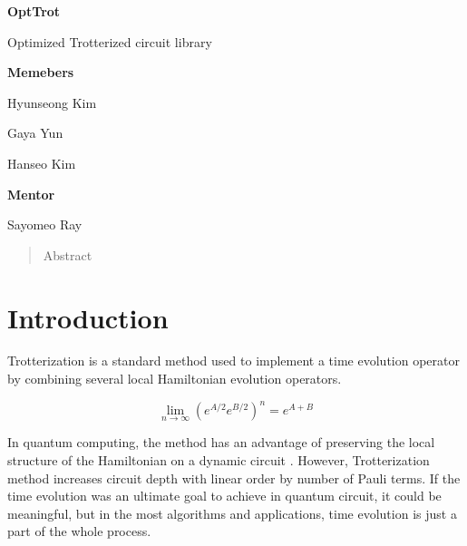 \documentclass[a4paper,12pt]{article}
\newcommand{\courseName}{2024 IonQ summer Mentoring}
\newcommand{\assignmentTitle}{OptTrot}
\begin{document}
\begin{center}

    \vspace{0.5cm}
    {\Large\bfseries \assignmentTitle \par}
    {\large Optimized Trotterized circuit library \par}
    \vspace{1cm}
    {
    \noindent
    \begin{minipage}{0.45\textwidth}
        \centering
        \textbf{Memebers}

        Hyunseong Kim

        Gaya Yun

        Hanseo Kim
    \end{minipage}
    \begin{minipage}{0.45\textwidth}
        \centering
        \textbf{Mentor}

        Sayomeo Ray
    \end{minipage}
    }
    \begin{abstract}
    Abstract
    \end{abstract}
\end{center}



\section{Introduction}

Trotterization is a standard method used to implement a time evolution operator 
by combining several local Hamiltonian evolution operators.

\begin{equation}
    \lim_{n \rightarrow \infty} (e^{A/2} e^{B/2})^n = e^{A+B}
\end{equation}

In quantum computing, the method has an advantage of preserving the local structure of 
the Hamiltonian on a dynamic circuit \cite{childs_theory_2021}.
However, Trotterization method increases circuit depth with linear order by number of Pauli terms.
If the time evolution was an ultimate goal to achieve in quantum circuit, 
it could be meaningful, but in the most algorithms and applications, time evolution 
is just a part of the whole process. 
\end{document}
